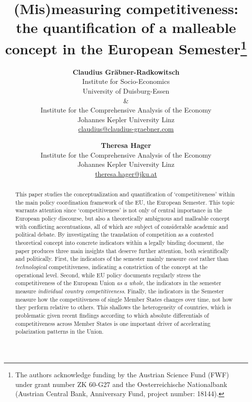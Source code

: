 \title{
  (Mis)measuring competitiveness: the quantification of a malleable concept in the European Semester\thanks{
    The authors acknowledge funding by the Austrian Science Fund (FWF) 
    under grant number ZK 60-G27 and the Oesterreichische Nationalbank 
    (Austrian Central Bank, Anniversary Fund, project number: 18144).}
}

\author{
  \textbf{Claudius Gräbner-Radkowitsch} \\
  Institute for Socio-Economics\\
  University of Duisburg-Essen\\
  \& \\
  Institute for the Comprehensive Analysis of the Economy\\
  Johannes Kepler University Linz\\
  \href{mailto:claudius@claudius-graebner.com}{claudius@claudius-graebner.com} \\
  \and
  \textbf{Theresa Hager}\\
  Institute for the Comprehensive Analysis of the Economy\\
  Johannes Kepler University Linz\\
  \href{mailto:theresa.hager@jku.at}{theresa.hager@jku.at} \\
}
\maketitle
\setcounter{footnote}{0}

\begin{abstract}
\small
This paper studies the conceptualization and quantification of 
`competitiveness’ within the main policy coordination framework 
of the EU, the European Semester. This topic warrants 
attention since `competitiveness' is not only of central importance in the European policy discourse, but also a theoretically ambiguous and malleable concept
with conflicting accentuations, all of which are subject of considerable 
academic and political debate. 
By investigating the translation of competition as a contested theoretical concept into 
concrete indicators within a legally binding document, the paper produces three main 
insights that deserve further attention, both scientifically and politically.
First, the indicators of the semester mainly measure \textit{cost} rather than 
\textit{technological} competitiveness, indicating a constriction of the 
concept at the operational level.
Second, while EU policy documents regularly stress the competitiveness of the 
European Union \textit{as a whole}, the indicators in the semester measure 
\textit{individual country competitiveness}.
Finally, the indicators in the Semester measure how the competitiveness of
single Member States changes over time, not how they perform relative to 
others. 
This shallows the heterogeneity of countries, which is problematic 
given recent findings according to which absolute differentials of
competitiveness across Member States is one important driver of accelerating 
polarization patterns in the Union.

\end{abstract}

\newpage
{}
\setcounter{page}{1}
